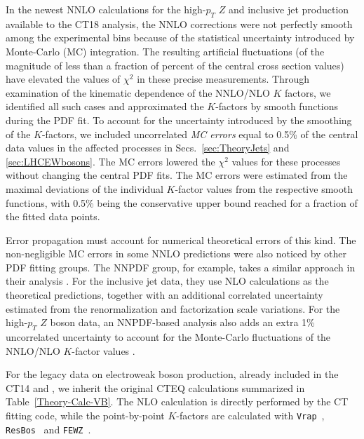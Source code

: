 In the newest NNLO calculations for the high-$p_T$ $Z$ and inclusive jet production available to the CT18 analysis, the NNLO corrections were not perfectly smooth among the experimental bins because of the statistical uncertainty introduced by Monte-Carlo (MC) integration. The resulting artificial fluctuations (of the magnitude of less than a fraction of percent of the central cross section values) have elevated the values of $\chi^2$ in these precise measurements. Through examination of the kinematic dependence of the NNLO/NLO $K$ factors, we identified all such cases and approximated the $K$-factors by smooth functions during the PDF fit. To account for the uncertainty introduced by the smoothing of the $K$-factors, we included  uncorrelated {\it MC errors} equal to 0.5\% of the central data values in the affected processes in Secs.~\ref{sec:TheoryJets} and \ref{sec:LHCEWbosons}. The MC errors lowered the $\chi^2$ values for these processes without changing the central PDF fits. The MC errors were estimated from the maximal deviations of the individual $K$-factor values from the respective smooth functions, with 0.5\% being the conservative upper bound reached for a fraction of the fitted data points.

Error propagation must account for numerical theoretical errors of this kind. The non-negligible MC errors in some NNLO predictions were also noticed by other PDF fitting groups. The NNPDF group, for example, takes a similar approach in their analysis \cite{Ball:2017nwa}. For the inclusive jet data, they use NLO calculations as the theoretical predictions, together with an additional correlated uncertainty estimated from the renormalization and factorization scale variations. For the high-$p_T$ $Z$ boson data, an NNPDF-based analysis also adds an extra 1\% uncorrelated uncertainty to account for the Monte-Carlo fluctuations of the NNLO/NLO $K$-factor values \cite{Boughezal:2016wmq}.

For the legacy data on electroweak boson production, already included in the CT14 and \CTHERAII, 
we inherit the original CTEQ calculations summarized in Table~\ref{Theory-Calc-VB}. 
The NLO calculation is directly performed by the CT fitting code, while the point-by-point $K$-factors are calculated with 
\texttt{Vrap}~\cite{Anastasiou:2003ds,Anastasiou:2003yy}, \texttt{ResBos}~\cite{Ladinsky:1993zn,Konychev:2005iy} and
\texttt{FEWZ}~\cite{Gavin:2010az,Gavin:2012sy,Li:2012wna}.


